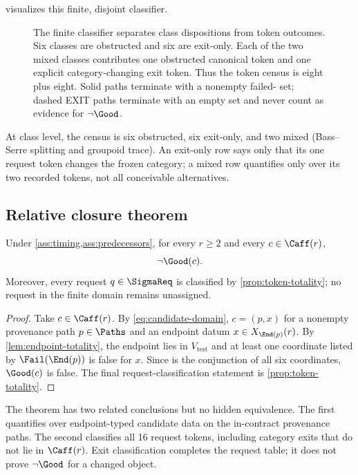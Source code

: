  visualizes this finite, disjoint classifier.

\begin{figure}[H]
  \centering
  \resizebox{0.96\textwidth}{!}{}
  \caption{The finite classifier separates class dispositions from token
  outcomes.  Six classes are obstructed and six are exit-only.  Each of the two
  mixed classes contributes one obstructed canonical token and one explicit
  category-changing exit token.  Thus the token census is eight plus eight.
  Solid paths terminate with a nonempty failed-\Good{} set; dashed EXIT paths
  terminate with an empty set and never count as evidence for $\neg\Good$.}
  \label{fig:classification}
\end{figure}

At class level, the census is six obstructed, six exit-only, and two mixed
(Bass--Serre splitting and groupoid trace).  An exit-only row says only that its
one request token changes the frozen category; a mixed row quantifies only over
its two recorded tokens, not all conceivable alternatives.

\subsection{Relative closure theorem}

\begin{theorem}
\label{thm:closure}
Under \cref{ass:timing,ass:predecessors}, for every $r\ge2$ and every
$c\in\Caff(r)$,
\[
\neg\Good(c).
\]
Moreover, every request $q\in\SigmaReq$ is classified by
\cref{prop:token-totality}; no request in the finite domain remains unassigned.
\end{theorem}

\begin{proof}
Take $c\in\Caff(r)$.  By \cref{eq:candidate-domain}, $c=(p,x)$ for a nonempty
provenance path $p\in\Paths$ and an endpoint datum
$x\in X_{\End(p)}(r)$.  By \cref{lem:endpoint-totality}, the endpoint lies in
$V_{\mathrm{test}}$ and at least one coordinate listed by
$\Fail(\End(p))$ is false for $x$.  Since \Good{} is the conjunction of all
six coordinates, $\Good(c)$ is false.  The final request-classification
statement is \cref{prop:token-totality}.
\end{proof}

The theorem has two related conclusions but no hidden equivalence.  The first
quantifies over endpoint-typed candidate data on the in-contract provenance
paths.  The second classifies all 16 request tokens, including category exits
that do not lie in $\Caff(r)$.  Exit classification completes the request table;
it does not prove $\neg\Good$ for a changed object.

